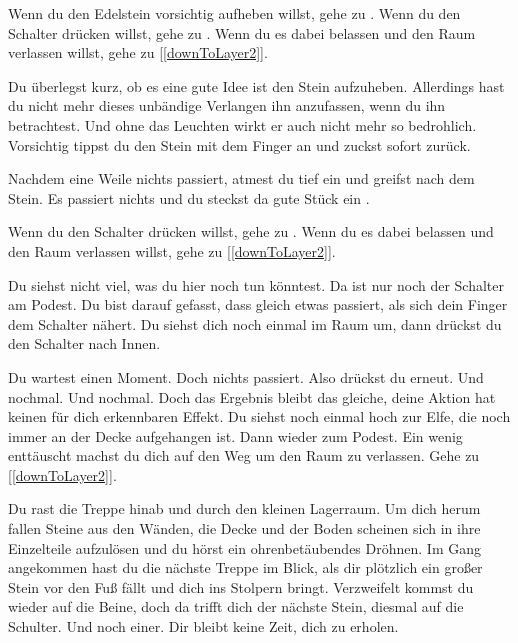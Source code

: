 Wenn du den Edelstein vorsichtig aufheben willst, gehe zu .
Wenn du den Schalter drücken willst, gehe zu .
Wenn du es dabei belassen und den Raum verlassen willst, gehe zu [\ref{downToLayer2}].


Du überlegst kurz, ob es eine gute Idee ist den Stein aufzuheben. Allerdings hast du nicht mehr dieses unbändige Verlangen ihn anzufassen, wenn du ihn betrachtest. Und ohne das Leuchten wirkt er auch nicht mehr so bedrohlich. Vorsichtig tippst du den Stein mit dem Finger an und zuckst sofort zurück.

Nachdem eine Weile nichts passiert, atmest du tief ein und greifst nach dem Stein. Es passiert nichts und du steckst da gute Stück ein .

Wenn du den Schalter drücken willst, gehe zu .
Wenn du es dabei belassen und den Raum verlassen willst, gehe zu [\ref{downToLayer2}].


Du siehst nicht viel, was du hier noch tun könntest. Da ist nur noch der Schalter am Podest. Du bist darauf gefasst, dass gleich etwas passiert, als sich dein Finger dem Schalter nähert. Du siehst dich noch einmal im Raum um, dann drückst du den Schalter nach Innen.

Du wartest einen Moment. Doch nichts passiert. Also drückst du erneut. Und nochmal. Und nochmal. Doch das Ergebnis bleibt das gleiche, deine Aktion hat keinen für dich erkennbaren Effekt. Du siehst noch einmal hoch zur Elfe, die noch immer an der Decke aufgehangen ist. Dann wieder zum Podest. Ein wenig enttäuscht machst du dich auf den Weg um den Raum zu verlassen. Gehe zu [\ref{downToLayer2}].


Du rast die Treppe hinab und durch den kleinen Lagerraum. Um dich herum fallen Steine aus den Wänden, die Decke und der Boden scheinen sich in ihre Einzelteile aufzulösen und du hörst ein ohrenbetäubendes Dröhnen. Im Gang angekommen hast du die nächste Treppe im Blick, als dir plötzlich ein großer Stein vor den Fuß fällt und dich ins Stolpern bringt. Verzweifelt kommst du wieder auf die Beine, doch da trifft dich der nächste Stein, diesmal auf die Schulter. Und noch einer. Dir bleibt keine Zeit, dich zu erholen.

